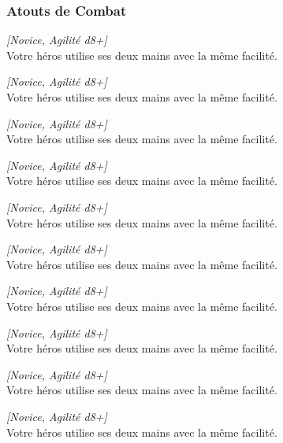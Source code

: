 \subsubsection{Atouts de Combat}
\begin{description}[align=left]
    \item [Ambidextre]
    	\emph{[Novice, Agilité d8+]}\\
        Votre héros utilise ses deux mains avec la même facilité.
    \item [Ambidextre]
    	\emph{[Novice, Agilité d8+]}\\
        Votre héros utilise ses deux mains avec la même facilité.
    \item [Ambidextre]
    	\emph{[Novice, Agilité d8+]}\\
        Votre héros utilise ses deux mains avec la même facilité.
    \item [Ambidextre]
    	\emph{[Novice, Agilité d8+]}\\
        Votre héros utilise ses deux mains avec la même facilité.
    \item [Ambidextre]
    	\emph{[Novice, Agilité d8+]}\\
        Votre héros utilise ses deux mains avec la même facilité.
    \item [Ambidextre]
    	\emph{[Novice, Agilité d8+]}\\
        Votre héros utilise ses deux mains avec la même facilité.
    \item [Ambidextre]
    	\emph{[Novice, Agilité d8+]}\\
        Votre héros utilise ses deux mains avec la même facilité.
    \item [Ambidextre]
    	\emph{[Novice, Agilité d8+]}\\
        Votre héros utilise ses deux mains avec la même facilité.
    \item [Ambidextre]
    	\emph{[Novice, Agilité d8+]}\\
        Votre héros utilise ses deux mains avec la même facilité.
    \item [Ambidextre]
    	\emph{[Novice, Agilité d8+]}\\
        Votre héros utilise ses deux mains avec la même facilité.
\end{description}